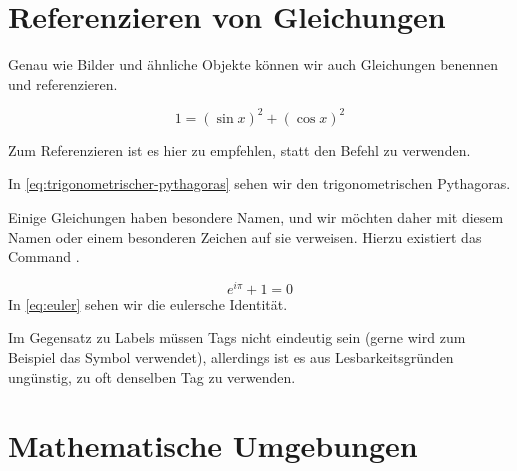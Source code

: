 \section{Referenzieren von Gleichungen}

Genau wie Bilder und ähnliche Objekte können wir auch Gleichungen benennen und referenzieren.
\begin{latexlisting}
	\begin{equation}\label{eq:trigonometrischer-pythagoras}
		1 = (\sin x)^2 + (\cos x)^2
	\end{equation}
\end{latexlisting}
Zum Referenzieren ist es hier zu empfehlen, statt  den Befehl  zu verwenden.
\begin{latexlisting}
	In \eqref{eq:trigonometrischer-pythagoras} sehen wir den trigonometrischen Pythagoras.
\end{latexlisting}
Einige Gleichungen haben besondere Namen, und wir möchten daher mit diesem Namen oder einem besonderen Zeichen auf sie verweisen.
Hierzu existiert das Command .
\begin{latexlisting}
	\begin{equation}\label{eq:euler}\tag{Euler}
		e^{i \pi} + 1 = 0
	\end{equation}
	In \eqref{eq:euler} sehen wir die eulersche Identität.
\end{latexlisting}
Im Gegensatz zu Labels müssen Tags nicht eindeutig sein (gerne wird zum Beispiel das Symbol \star{} verwendet), allerdings ist es aus Lesbarkeitsgründen ungünstig, zu oft denselben Tag zu verwenden.

\section{Mathematische Umgebungen}

